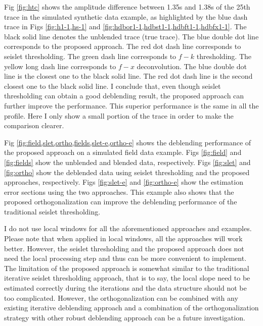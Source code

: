 Fig \ref{fig:htc} shows the amplitude difference between 1.35s and 1.38s of the 25th trace in the simulated synthetic data example, as highlighted by the blue dash trace in Figs \ref{fig:h1-1,hs-1} and \ref{fig:hdbor1-1,hdbst1-1,hdbft1-1,hdbfx1-1}. The black solid line denotes the unblended trace (true trace). The blue double dot line corresponds to the proposed approach. The red dot dash line corresponds to seislet thresholding. The green dash line corresponds to $f-k$ thresholding. The yellow long dash line corresponds to $f-x$ deconvolution. The blue double dot line is the closest one to the black solid line. The red dot dash line is the second closest one to the black solid line. I conclude that, even though seislet thresholding can obtain a good deblending result, the proposed approach can further improve the performance. This superior performance is the same in all the profile. Here I only show a small portion of the trace in order to make the comparison clearer.

 
Fig \ref{fig:field,slet,ortho,fields,slet-e,ortho-e} shows the deblending performance of the proposed approach on a simulated field data example. Figs \ref{fig:field} and \ref{fig:fields} show the unblended and blended data, respectively. Figs \ref{fig:slet} and \ref{fig:ortho} show the deblended data using seislet thresholding and the proposed approaches, respectively. Figs \ref{fig:slet-e} and \ref{fig:ortho-e} show the estimation error sections using the two approaches. This example also shows that the proposed orthogonalization can improve the deblending performance of the traditional seislet thresholding.

I do not use local windows \cite{sanyi2011} for all the aforementioned approaches and examples. Please note that when applied in local windows, all the approaches will work better. However, the seislet thresholding and the proposed approach does not need the local processing step and thus can be more convenient to implement. The limitation of the proposed approach is somewhat similar to the traditional iterative seislet thresholding approach, that is to say, the local slope need to be estimated correctly during the iterations and the data structure should not be too complicated. However, the orthogonalization can be combined with any existing iterative deblending approach and a combination of the orthogonalization strategy with other robust deblending approach can be a future investigation. 


